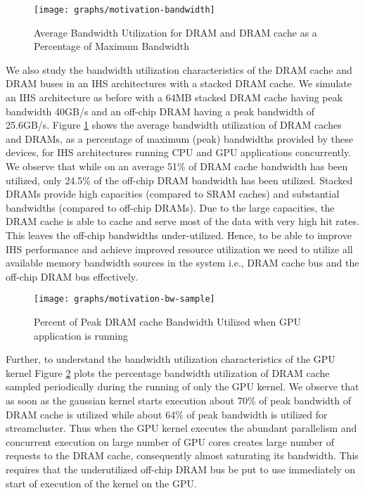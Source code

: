\begin{figure}[htb]
	\centering
	\texttt{[image: graphs/motivation-bandwidth]}
	\caption{Average Bandwidth Utilization for DRAM and DRAM cache as a Percentage of Maximum Bandwidth}
	\label{fig:motivation-banwdidth}
\end{figure}


\par We also study the bandwidth utilization characteristics of the DRAM cache and DRAM buses in an IHS architectures with a stacked DRAM cache. We simulate an IHS architecture as before with a 64MB stacked DRAM cache having peak bandwidth 40GB/s and an off-chip DRAM having a peak bandwidth of 25.6GB/s. Figure \ref{fig:motivation-banwdidth} shows the average bandwidth utilization of DRAM caches and DRAMs, as a percentage of maximum (peak) bandwidths provided by these devices, for IHS architectures running CPU and GPU applications concurrently. We observe that while on an average 51\% of DRAM cache bandwidth has been utilized, only 24.5\% of the off-chip DRAM bandwidth has been utilized. Stacked DRAMs provide high capacities (compared to SRAM caches) and substantial bandwidths (compared to off-chip DRAMs). Due to the large capacities, the DRAM cache is able to cache and serve most of the data with very high hit rates. This leaves the off-chip bandwidths under-utilized. Hence, to be able to improve IHS performance and achieve improved resource utilization we need to utilize all available memory bandwidth sources in the system i.e., DRAM cache bus and the off-chip DRAM bus effectively.

\begin{figure}[htb]
	\centering
	\texttt{[image: graphs/motivation-bw-sample]}
	\caption{Percent of Peak DRAM cache Bandwidth Utilized when GPU application is running}
	\label{fig:motivation-banwdidth-gpu}
\end{figure}

\par Further, to understand the bandwidth utilization characteristics of the GPU kernel Figure \ref{fig:motivation-banwdidth-gpu} plots the percentage bandwidth utilization of DRAM cache sampled periodically during the running of only the GPU kernel. We observe that as soon as the gaussian kernel starts execution about 70\% of peak bandwidth of DRAM cache is utilized while about 64\% of peak bandwidth is utilized for streamcluster. Thus when the GPU kernel executes the abundant parallelism and concurrent execution on large number of GPU cores creates large number of requests to the DRAM cache, consequently almost saturating its bandwidth. This requires that the underutilized off-chip DRAM bus be put to use immediately on start of execution of the kernel on the GPU.

